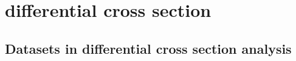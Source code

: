 
\chapter{\ttbar differential cross section}
\label{ac:ttbar_diff_cross_section_analysis}

\section{Datasets in differential cross section analysis}
\label{as:datasets}

%
%



%
%


